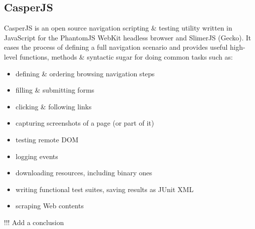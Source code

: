 \subsection{CasperJS}
		\cite{casperjs}
		CasperJS is an open source navigation scripting \& testing utility written in JavaScript for the PhantomJS WebKit headless browser and SlimerJS (Gecko). It eases the process of defining a full navigation scenario and provides useful high-level functions, methods \& syntactic sugar for doing common tasks such as:
\begin{itemize}
	\item defining \& ordering browsing navigation steps
	\item filling \& submitting forms
	\item clicking \& following links
	\item capturing screenshots of a page (or part of it)
	\item testing remote DOM
	\item logging events
	\item downloading resources, including binary ones
	\item writing functional test suites, saving results as JUnit XML
	\item scraping Web contents
\end{itemize}

!!! Add a conclusion
